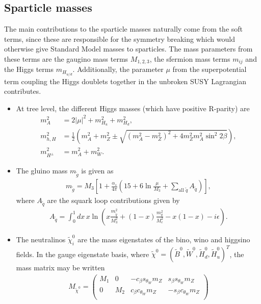 \documentclass[twoside,english]{uiofysmaster}
\begin{document}
 \subsection{Sparticle masses}
 The main contributions to the sparticle masses naturally come from the soft terms, since these are responsible for the symmetry breaking which would otherwise give Standard Model masses to sparticles. The mass parameters from these terms are the gaugino mass terms $M_{1,2,3}$, the sfermion mass terms $m_{ij}$ and the Higgs terms $m_{H_{u/d}}$. Additionally, the parameter $\mu$ from the superpotential term coupling the Higgs doublets together in the unbroken SUSY Lagrangian contributes.
 \begin{itemize}
 	\item At tree level, the different Higgs masses (which have positive R-parity) are
 	\begin{align}
 		m_A^2 &= 2|\mu|^2 + m^2_{H_u} + m^2_{H_d},\label{eq:mssm_higgs_masses1}\\
 		m^2_{h,H} &= \frac{1}{2} \left( m_A^2 + m_Z^2 \pm \sqrt{(m_A^2 - m_Z^2)^2 + 4m_Z^2m_A^2\sin^2 2\beta} \right),\label{eq:mssm_higgs_masses2}\\
 		m^2_{H^\pm} &= m_A^2 + m_W^2.
 	\end{align}
 	\item The gluino mass $m_{\tilde g}$ is given as
 	\begin{align}
 		m_{\tilde g} = M_3 \left[ 1 + \frac{\alpha_s}{4\pi}\left( 15 + 6\ln\frac{\mu}{M_3} + \sum_{\mathrm{all} \,\,\tilde q} A_{\tilde q} \right)\right],
 	\end{align}
 	where $A_{\tilde q}$ are the squark loop contributions given by
 	\begin{align}
 		A_{\tilde q} = \int_0^1 dx \, x \ln\left( x \frac{m^2_{\tilde q}}{M_3^2} + (1-x)\frac{m_q^2}{M_e^2} - x(1-x) - i\epsilon \right).
 	\end{align}%
 	\item The neutralinos $\tilde\chi_i^0$ are the mass eigenstates of the bino, wino and higgsino fields. In the gauge eigenstate basis, where $\tilde\chi^{0} = (\tilde B^0, \tilde W^0, \tilde H_d^0, \tilde H_u^0)^T$, the mass matrix may be written
 	\begin{align}
 		M_{\tilde \chi^0} = \begin{pmatrix}
 			M_1 & 0 & - c_\beta s_{\theta_W} m_Z &  s_\beta s_{\theta_W} m_Z \\
 			0 & M_2 &  c_\beta c_{\theta_W} m_Z & - s_\beta c_{\theta_W} m_Z\\

\end{pmatrix}
\end{align}
\end{itemize}
\end{document}
